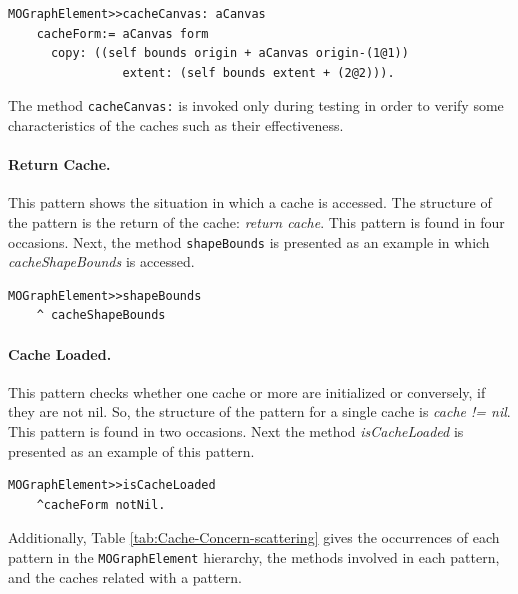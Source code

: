 \documentclass[preprint,10pt]{sigplanconf}
\newcommand{\ct}{\lstinline[backgroundcolor=\color{white},basicstyle=\footnotesize\ttfamily]}
\begin{document}
\begin{lstlisting} 
MOGraphElement>>cacheCanvas: aCanvas 
	cacheForm:= aCanvas form 
	  copy: ((self bounds origin + aCanvas origin-(1@1)) 
				extent: (self bounds extent + (2@2))). 
\end{lstlisting}

The method \ct{cacheCanvas:} is invoked only during testing in order to verify some characteristics of the caches such as their effectiveness.

\paragraph{Return Cache.} This pattern shows the situation in which a cache
is accessed. The structure of the pattern is the return of the cache:
\emph{return cache}. This pattern is found in four occasions. Next, the method \ct{shapeBounds} is presented as an example in which
\emph{cacheShapeBounds} is accessed.

\begin{lstlisting} 
MOGraphElement>>shapeBounds  
	^ cacheShapeBounds
\end{lstlisting}

\paragraph{Cache Loaded.} This pattern checks whether one cache or more
are initialized or conversely, if they are not nil. So, the structure of the
pattern for a single cache is \emph{cache != nil}. This pattern is
found in two occasions. Next the method \emph{isCacheLoaded} is presented
as an example of this pattern.

\begin{lstlisting} 
MOGraphElement>>isCacheLoaded 
	^cacheForm notNil. 
\end{lstlisting}


Additionally, Table \ref{tab:Cache-Concern-scattering} gives the occurrences of each pattern in the \ct{MOGraphElement} hierarchy,
the methods involved in each pattern, and the caches related with
a pattern.
\end{document}

